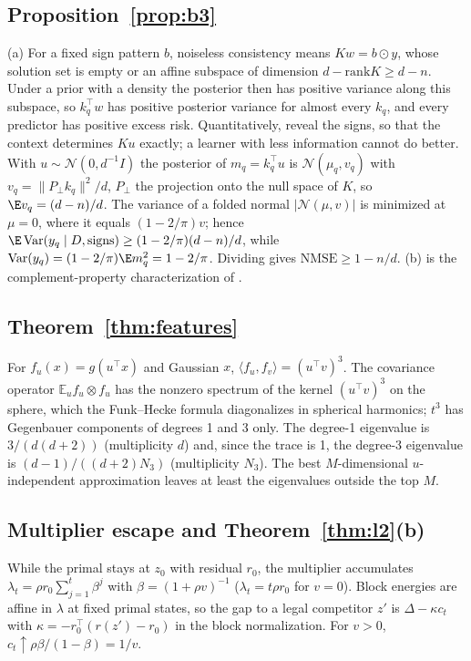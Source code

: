 \documentclass{article}
\theoremstyle{definition}
\theoremstyle{remark}
\newcommand{\Ex}{\mathbb{E}}
\begin{document}
\subsection{Proposition~\ref{prop:b3}}
(a) For a fixed sign pattern $b$, noiseless consistency means $Kw=b\odot y$, whose solution set is empty or an affine subspace of dimension $d-\mathrm{rank}K\geq d-n$. Under a prior with a density the posterior then has positive variance along this subspace, so $k_q^\top w$ has positive posterior variance for almost every $k_q$, and every predictor has positive excess risk. Quantitatively, reveal the signs, so that the context determines $Ku$ exactly; a learner with less information cannot do better. With $u\sim\mathcal N(0,d^{-1}I)$ the posterior of $m_q=k_q^\top u$ is $\mathcal N(\mu_q,v_q)$ with $v_q=\|P_\perp k_q\|^2/d$, $P_\perp$ the projection onto the null space of $K$, so $\E v_q=(d-n)/d$. The variance of a folded normal $|\mathcal N(\mu,v)|$ is minimized at $\mu=0$, where it equals $(1-2/\pi)v$; hence $\E\,\mathrm{Var}(y_q\mid D,\text{signs})\geq(1-2/\pi)(d-n)/d$, while $\mathrm{Var}(y_q)=(1-2/\pi)\E m_q^2=1-2/\pi$. Dividing gives $\mathrm{NMSE}\geq1-n/d$. (b) is the complement-property characterization of \citet{balan2006phase}.

\subsection{Theorem~\ref{thm:features}}
\label{app:features}
For $f_u(x)=g(u^\top x)$ and Gaussian $x$, $\langle f_u,f_v\rangle=(u^\top v)^3$. The covariance operator $\Ex_uf_u\otimes f_u$ has the nonzero spectrum of the kernel $(u^\top v)^3$ on the sphere, which the Funk--Hecke formula diagonalizes in spherical harmonics; $t^3$ has Gegenbauer components of degrees 1 and 3 only. The degree-1 eigenvalue is $3/(d(d+2))$ (multiplicity $d$) and, since the trace is 1, the degree-3 eigenvalue is $(d-1)/((d+2)N_3)$ (multiplicity $N_3$). The best $M$-dimensional $u$-independent approximation leaves at least the eigenvalues outside the top $M$.

\subsection{Multiplier escape and Theorem~\ref{thm:l2}(b)}
\label{app:escape}
While the primal stays at $z_0$ with residual $r_0$, the multiplier accumulates $\lambda_t=\rho r_0\sum_{j=1}^t\beta^j$ with $\beta=(1+\rho v)^{-1}$ ($\lambda_t=t\rho r_0$ for $v=0$). Block energies are affine in $\lambda$ at fixed primal states, so the gap to a legal competitor $z'$ is $\Delta-\kappa c_t$ with $\kappa=-r_0^\top(r(z')-r_0)$ in the block normalization. For $v>0$, $c_t\uparrow\rho\beta/(1-\beta)=1/v$.
\end{document}

